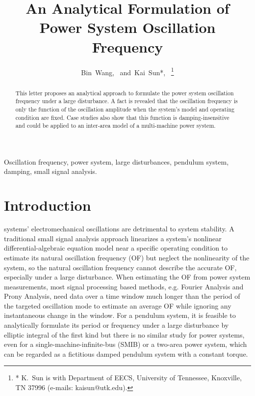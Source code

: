 \documentclass[journal]{IEEEtran}
\begin{document}
\title{An Analytical Formulation of Power System Oscillation Frequency}
\author{
        Bin~Wang,~
        and~Kai~Sun*,~
          \thanks{* K.~Sun is with Department of EECS, University of Tennessee, Knoxville, TN 37996 (e-mails:  kaisun@utk.edu).}
}
\maketitle

\begin{abstract}
This letter proposes an analytical approach to formulate the power system oscillation frequency under a large disturbance. A fact is revealed that the oscillation frequency is only the function of the oscillation amplitude when the system's model and operating condition are fixed. Case studies also show that this function is damping-insensitive and could be applied to an inter-area model of a multi-machine power system.
\end{abstract}
\begin{IEEEkeywords}
Oscillation frequency, power system, large disturbances, pendulum system, damping, small signal analysis.
\end{IEEEkeywords}

\section{Introduction}
 systems' electromechanical oscillations are detrimental to system stability. A traditional small signal analysis approach linearizes a system's nonlinear differential-algebraic equation model near a specific operating condition to estimate its natural oscillation frequency (OF) but neglect the nonlinearity of the system, so the natural oscillation frequency cannot describe the accurate OF, especially under a large disturbance. When estimating the OF from power system measurements, most signal processing based methods, e.g. Fourier Analysis and Prony Analysis, need data over a time window much longer than the period of the targeted oscillation mode to estimate an average OF while ignoring any instantaneous change in the window. For a pendulum system, it is feasible to analytically formulate its period or frequency under a large disturbance by elliptic integral of the first kind\cite{website} but there is no similar study for power systems, even for a single-machine-infinite-bus (SMIB) or a two-area power system, which can be regarded as a fictitious damped pendulum system with a constant torque.
\end{document}
